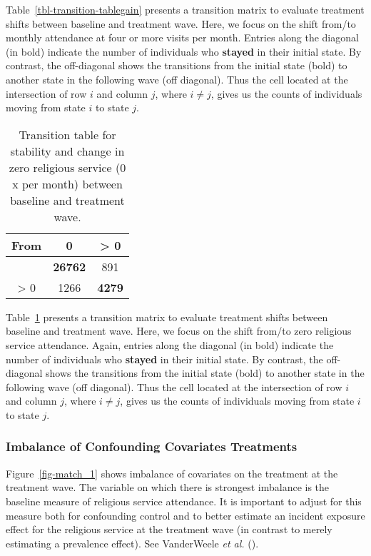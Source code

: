 \documentclass[
  single column]{article}
\begin{document}
Table~\ref{tbl-transition-tablegain} presents a transition matrix to
evaluate treatment shifts between baseline and treatment wave. Here, we
focus on the shift from/to monthly attendance at four or more visits per
month. Entries along the diagonal (in bold) indicate the number of
individuals who \textbf{stayed} in their initial state. By contrast, the
off-diagonal shows the transitions from the initial state (bold) to
another state in the following wave (off diagonal). Thus the cell
located at the intersection of row \(i\) and column \(j\), where
\(i \neq j\), gives us the counts of individuals moving from state \(i\)
to state \(j\).

\begin{longtable}[]{@{}ccc@{}}

\caption{\label{tbl-transition-tableloss}Transition table for stability
and change in zero religious service (0 x per month) between baseline
and treatment wave.}

\tabularnewline

\toprule\noalign{}
From & 0 & \textgreater{} 0 \\
\midrule\noalign{}
\endhead
\bottomrule\noalign{}
\endlastfoot
0 & \textbf{26762} & 891 \\
\textgreater{} 0 & 1266 & \textbf{4279} \\

\end{longtable}

Table~\ref{tbl-transition-tableloss} presents a transition matrix to
evaluate treatment shifts between baseline and treatment wave. Here, we
focus on the shift from/to zero religious service attendance. Again,
entries along the diagonal (in bold) indicate the number of individuals
who \textbf{stayed} in their initial state. By contrast, the
off-diagonal shows the transitions from the initial state (bold) to
another state in the following wave (off diagonal). Thus the cell
located at the intersection of row \(i\) and column \(j\), where
\(i \neq j\), gives us the counts of individuals moving from state \(i\)
to state \(j\).

\subsubsection{Imbalance of Confounding Covariates
Treatments}\label{imbalance-of-confounding-covariates-treatments}

Figure~\ref{fig-match_1} shows imbalance of covariates on the treatment
at the treatment wave. The variable on which there is strongest
imbalance is the baseline measure of religious service attendance. It is
important to adjust for this measure both for confounding control and to
better estimate an incident exposure effect for the religious service at
the treatment wave (in contrast to merely estimating a prevalence
effect). See VanderWeele \emph{et al.}
().
\end{document}
